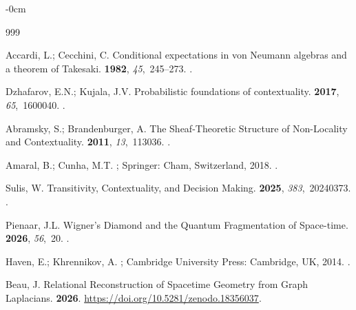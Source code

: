 \documentclass[quantumrep,article,accept,pdftex,oneauthor]{Definitions/mdpi}
\theoremstyle{remark}
\begin{document}
\begin{adjustwidth}{-\extralength}{0cm}

%    

\begin{thebibliography}{999}

Accardi, L.; Cecchini, C.
\newblock Conditional expectations in von Neumann algebras and a theorem of
Takesaki.
 {\bf 1982}, {\em 45},~245--273.
.

Dzhafarov, E.N.; Kujala, J.V.
\newblock Probabilistic foundations of contextuality.
 {\bf 2017}, {\em 65},~1600040.
.

Abramsky, S.; Brandenburger, A.
\newblock The Sheaf-Theoretic Structure of Non-Locality and Contextuality.
 {\bf 2011}, {\em 13},~113036.
.

Amaral, B.; Cunha, M.T.
; Springer: Cham, Switzerland, 2018.
.

Sulis, W.
\newblock Transitivity, Contextuality, and Decision Making.
 {\bf 2025},
  {\em 383},~20240373.
.

Pienaar, J.L.
\newblock Wigner's Diamond and the Quantum Fragmentation of Space-time.
 {\bf 2026}, {\em 56},~20.
.

Haven, E.; Khrennikov, A.
; Cambridge University Press: Cambridge, UK,
  2014.
.

Beau, J.
\newblock Relational Reconstruction of Spacetime Geometry from Graph
  Laplacians.
 {\bf 2026}.
\newblock
 {\url{https://doi.org/10.5281/zenodo.18356037}}.


\end{thebibliography}
\end{adjustwidth}
\end{document}
